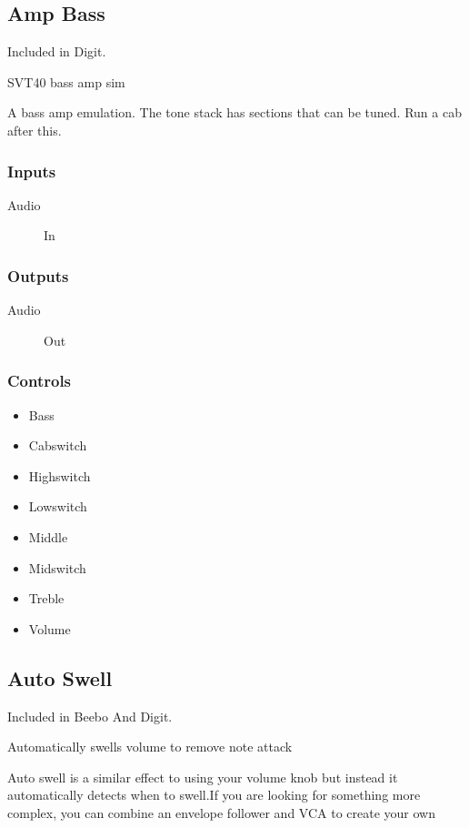 \subsection{Amp Bass}

Included in Digit.

SVT40 bass amp sim

A bass amp emulation. The tone stack has sections that can be tuned. Run a cab after this.

\subsubsection{Inputs}
\begin{description}
\item [Audio] In
\end{description}

\subsubsection{Outputs}
\begin{description}
\item [Audio] Out
\end{description}

\subsubsection{Controls}
\begin{itemize}
\item Bass
\item Cabswitch
\item Highswitch
\item Lowswitch
\item Middle
\item Midswitch
\item Treble
\item Volume
\end{itemize}

\subsection{Auto Swell}

Included in Beebo And Digit.

Automatically swells volume to remove note attack

Auto swell is a similar effect to using your volume knob but instead it automatically detects when to swell.If you are looking for something more complex, you can combine an envelope follower and VCA to create your own

